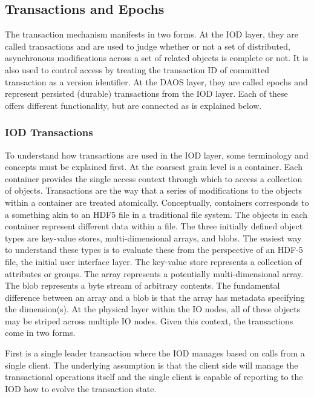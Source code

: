 \documentclass[conference]{IEEEtran}
\newcommand{\DDT}{D\textsuperscript{2}T~}
\newcommand{\DDTns}{D\textsuperscript{2}T}
\begin{document}
\subsection{Transactions and Epochs}
\label{sec:transactions}

The transaction mechanism manifests in two forms. At the IOD layer, they are
called transactions and are used to judge whether or not a set of distributed,
asynchronous modifications across a set of related objects is complete or not.
It is also used to control access by treating the transaction ID of committed
transaction as a version identifier.  At the DAOS layer, they are called epochs
and represent persisted (durable) transactions from the IOD layer. Each of
these offers different functionality, but are connected as is explained below.

\subsubsection{IOD Transactions}
To understand how transactions are used in the IOD layer, some terminology and
concepts must be explained first. At the coarsest grain level is a container.
Each container provides the single access context through which to access a
collection of objects. Transactions are the way that a series of modifications
to the objects within a container are treated atomically. Conceptually,
containers corresponds to a something akin to an HDF5 file in a traditional
file system. The objects in each container represent different data within a
file.  The three initially defined object types are key-value stores,
multi-dimensional arrays, and blobs.  The easiest way to understand these types
is to evaluate these from the perspective of an HDF-5 file, the initial user
interface layer. The key-value store represents a collection of attributes or
groups. The array represents a potentially multi-dimensional array.  The blob
represents a byte stream of arbitrary contents.  The fundamental difference
between an array and a blob is that the array has metadata specifying the
dimension(s). At the physical layer within the IO nodes, all of these objects
may be striped across multiple IO nodes.  Given this context, the transactions
come in two forms.

First is a single leader transaction where the IOD manages based on calls from
a single client. The underlying assumption is that the client side will manage
the transactional operations itself and the single client is capable of
reporting to the IOD how to evolve the transaction state. 
\end{document}
